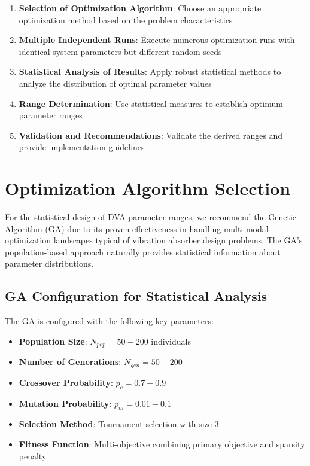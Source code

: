 \documentclass[../main.tex]{subfiles}
\begin{document}
\begin{enumerate}
    \item \textbf{Selection of Optimization Algorithm}: Choose an appropriate optimization method based on the problem characteristics
    \item \textbf{Multiple Independent Runs}: Execute numerous optimization runs with identical system parameters but different random seeds
    \item \textbf{Statistical Analysis of Results}: Apply robust statistical methods to analyze the distribution of optimal parameter values
    \item \textbf{Range Determination}: Use statistical measures to establish optimum parameter ranges
    \item \textbf{Validation and Recommendations}: Validate the derived ranges and provide implementation guidelines
\end{enumerate}

\section{Optimization Algorithm Selection}

For the statistical design of DVA parameter ranges, we recommend the Genetic Algorithm (GA) due to its proven effectiveness in handling multi-modal optimization landscapes typical of vibration absorber design problems. The GA's population-based approach naturally provides statistical information about parameter distributions.

\subsection{GA Configuration for Statistical Analysis}

The GA is configured with the following key parameters:

\begin{itemize}
    \item \textbf{Population Size}: $N_{pop} = 50-200$ individuals
    \item \textbf{Number of Generations}: $N_{gen} = 50-200$
    \item \textbf{Crossover Probability}: $p_c = 0.7-0.9$
    \item \textbf{Mutation Probability}: $p_m = 0.01-0.1$
    \item \textbf{Selection Method}: Tournament selection with size 3
    \item \textbf{Fitness Function}: Multi-objective combining primary objective and sparsity penalty
\end{itemize}
\end{document}
